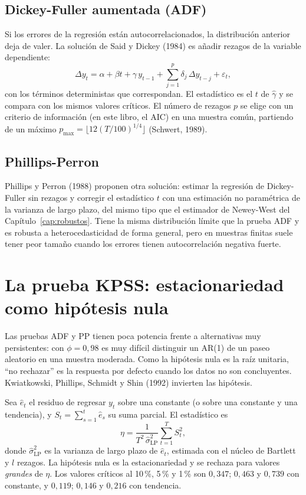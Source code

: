 \subsection{Dickey-Fuller aumentada (ADF)}

Si los errores de la regresión están autocorrelacionados, la distribución anterior deja de valer. La
solución de Said y Dickey (1984) es añadir rezagos de la variable dependiente:
\[
  \Delta y_t=\alpha+\beta t+\gamma\,y_{t-1}+\sum_{j=1}^{p}\delta_j\,\Delta y_{t-j}+\varepsilon_t,
\]
con los términos deterministas que correspondan. El estadístico es el $t$ de $\hat\gamma$ y se compara con
los mismos valores críticos. El número de rezagos $p$ se elige con un criterio de información (en este libro,
el AIC) en una muestra común, partiendo de un máximo $p_{\max}=\lfloor12(T/100)^{1/4}\rfloor$ (Schwert, 1989).

\subsection{Phillips-Perron}

Phillips y Perron (1988) proponen otra solución: estimar la regresión de Dickey-Fuller sin rezagos y
corregir el estadístico $t$ con una estimación no paramétrica de la varianza de largo plazo, del mismo tipo
que el estimador de Newey-West del Capítulo~\ref{cap:robustos}. Tiene la misma distribución límite que la
prueba ADF y es robusta a heterocedasticidad de forma general, pero en muestras finitas suele tener peor
tamaño cuando los errores tienen autocorrelación negativa fuerte.

\section{La prueba KPSS: estacionariedad como hipótesis nula}

Las pruebas ADF y PP tienen poca potencia frente a alternativas muy persistentes: con $\phi=0{,}98$ es muy
difícil distinguir un AR(1) de un paseo aleatorio en una muestra moderada. Como la hipótesis nula es la
raíz unitaria, ``no rechazar'' es la respuesta por defecto cuando los datos no son concluyentes. Kwiatkowski,
Phillips, Schmidt y Shin (1992) invierten las hipótesis.

\begin{definicion}
Sea $\hat e_t$ el residuo de regresar $y_t$ sobre una constante (o sobre una constante y una tendencia), y
$S_t=\sum_{s=1}^t\hat e_s$ su suma parcial. El estadístico es
\[
  \eta=\frac{1}{T^2\,\hat\sigma^2_{\mathrm{LP}}}\sum_{t=1}^TS_t^2,
\]
donde $\hat\sigma^2_{\mathrm{LP}}$ es la varianza de largo plazo de $\hat e_t$, estimada con el núcleo de
Bartlett y $l$ rezagos. La hipótesis nula es la estacionariedad y se rechaza para valores \emph{grandes} de
$\eta$. Los valores críticos al 10\,\%, 5\,\% y 1\,\% son $0{,}347$; $0{,}463$ y $0{,}739$ con constante, y
$0{,}119$; $0{,}146$ y $0{,}216$ con tendencia.
\end{definicion}

